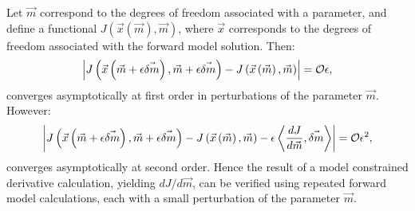 \documentclass[a4paper]{book}
\begin{document}
Let $\vec{m}$ correspond to the degrees of freedom associated with a parameter,
and define a functional
$J \left( \vec{x} \left( \vec{m} \right), \vec{m} \right)$, where $\vec{x}$
corresponds to the degrees of freedom associated with the forward model solution.
Then:
\begin{equation}
  \left| J \left( \vec{x} \left( \vec{m} + \epsilon \vec{\delta m} \right), \vec{m} + \epsilon \vec{\delta m} \right)
    - J \left( \vec{x} \left( \vec{m} \right), \vec{m} \right) \right|
    = {\cal O} \epsilon,
\end{equation}
converges asymptotically at first order in perturbations of the parameter
$\vec{m}$. However:
\begin{equation}
  \left| J \left( \vec{x} \left( \vec{m} + \epsilon \vec{\delta m} \right), \vec{m} + \epsilon \vec{\delta m} \right)
    - J \left( \vec{x} \left( \vec{m} \right), \vec{m} \right)
    - \epsilon \left< \frac{d J}{d \vec{m}}, \vec{\delta m} \right> \right|
    = {\cal O} \epsilon^2,
\end{equation}
converges asymptotically at second order. Hence the result of a model
constrained derivative calculation, yielding $d J / d \vec{m}$, can be verified
using repeated forward model calculations, each with a small perturbation of the
parameter $\vec{m}$.
\end{document}
